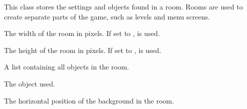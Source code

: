 \documentclass[letterpaper,10pt,english]{sphinxmanual}
\begin{document}
\begin{fulllineitems}
\label{dsp:sge.dsp.Room}
This class stores the settings and objects found in a room.  Rooms
are used to create separate parts of the game, such as levels and
menu screens.

\begin{fulllineitems}
\label{dsp:sge.dsp.Room.width}
The width of the room in pixels.  If set to ,
 is used.

\end{fulllineitems}


\begin{fulllineitems}
\label{dsp:sge.dsp.Room.height}
The height of the room in pixels.  If set to ,
 is used.

\end{fulllineitems}


\begin{fulllineitems}
\label{dsp:sge.dsp.Room.views}
A list containing all {\hyperref[dsp:sge.dsp.View]{\emph{}}} objects in the room.

\end{fulllineitems}


\begin{fulllineitems}
\label{dsp:sge.dsp.Room.background}
The {\hyperref[gfx:sge.gfx.Background]{\emph{}}} object used.

\end{fulllineitems}


\begin{fulllineitems}
\label{dsp:sge.dsp.Room.background_x}
The horizontal position of the background in the room.


\end{fulllineitems}
\end{fulllineitems}
\end{document}
